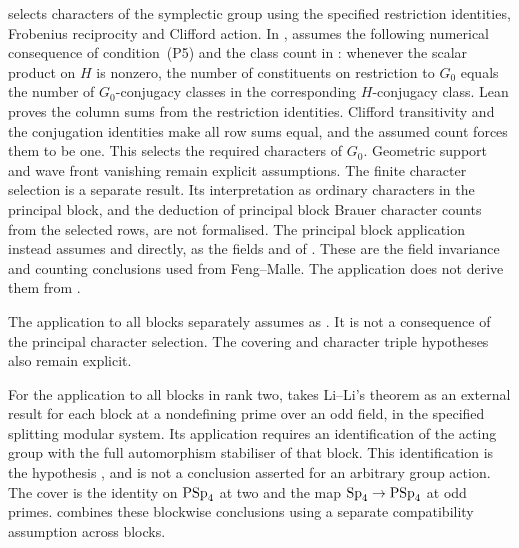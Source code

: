 \begin{implementation}
 selects characters of
the symplectic group using the specified restriction identities,
Frobenius reciprocity and Clifford action. In ,
 assumes the following numerical consequence of
condition~\textup{(P5)} and the class count in
\cite[Proposition~5.4]{Taylor2013}: whenever the scalar product on $H$ is nonzero, the number of constituents on restriction to $G_0$ equals the number of $G_0$-conjugacy classes in the corresponding $H$-conjugacy class.
Lean proves the column sums from the restriction identities.
Clifford transitivity and the conjugation identities make all row
sums equal, and the assumed count forces them to be one.
This selects the required characters of $G_0$. Geometric support and
wave front vanishing remain explicit assumptions.
The finite character selection is a separate result. Its interpretation
as ordinary characters in the principal block, and the deduction of
principal block Brauer character counts from the selected rows, are
not formalised. The principal block application instead assumes
 and 
directly, as the fields  and  of
. These are the field invariance
and counting conclusions used from Feng--Malle. The application does
not derive them from .

The application to all blocks separately assumes
\cite[Corollary~4.6]{FengMalle2022} as
.
It is not a consequence of the principal character selection.
The covering and character triple hypotheses also remain explicit.

For the application to all blocks in rank two,
 takes Li--Li's theorem as an
external result for each block at a nondefining prime over an odd field,
in the specified splitting modular system. Its application requires
an identification of the acting group with the full automorphism
stabiliser of that block. This identification is the hypothesis
, and is not a
conclusion asserted for an arbitrary group action. The cover is the identity on $\operatorname{PSp}_4$ at two and the map
$\operatorname{Sp}_4\to\operatorname{PSp}_4$ at odd primes.
 combines these
blockwise conclusions using a separate compatibility assumption across
blocks.


\end{implementation}
